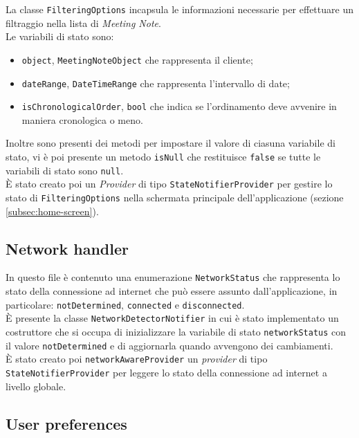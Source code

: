 La classe \lstinline{FilteringOptions} incapsula le informazioni necessarie per effettuare un filtraggio nella lista di \emph{Meeting Note}.\\
Le variabili di stato sono:
\begin{itemize}
    \item \lstinline{object}, \lstinline{MeetingNoteObject} che rappresenta il \gls{cliente}\glsoccur;
    \item \lstinline{dateRange}, \lstinline{DateTimeRange} che rappresenta l'intervallo di date;
    \item \lstinline{isChronologicalOrder}, \lstinline{bool} che indica se l'ordinamento deve avvenire in maniera cronologica o meno.
\end{itemize}
Inoltre sono presenti dei metodi per impostare il valore di ciasuna variabile di stato, vi è poi presente un metodo \lstinline{isNull} che restituisce \lstinline{false} se tutte le variabili di stato sono \lstinline{null}. \\
È stato creato poi un \emph{Provider} di tipo \lstinline{StateNotifierProvider}\cite{site:state-notifier-provider} per gestire lo stato di \lstinline{FilteringOptions} nella schermata principale dell'applicazione (sezione \ref{subsec:home-screen}).

\subsection{Network handler}
\label{subsec:network-handler}

In questo file è contenuto una enumerazione \lstinline{NetworkStatus} che rappresenta lo stato della connessione ad internet che può essere assunto dall'applicazione, in particolare: \lstinline{notDetermined}, \lstinline{connected} e \lstinline{disconnected}. \\
È presente la classe \lstinline{NetworkDetectorNotifier} in cui è stato implementato un costruttore che si occupa di inizializzare la variabile di stato \lstinline{networkStatus} con il valore \lstinline{notDetermined} e di aggiornarla quando avvengono dei cambiamenti. \\
È stato creato poi \lstinline{networkAwareProvider} un \emph{provider} di tipo \lstinline{StateNotifierProvider}\cite{site:state-notifier-provider} per leggere lo stato della connessione ad internet a livello globale.

\subsection{User preferences}
\label{subsec:shared-preferences}

